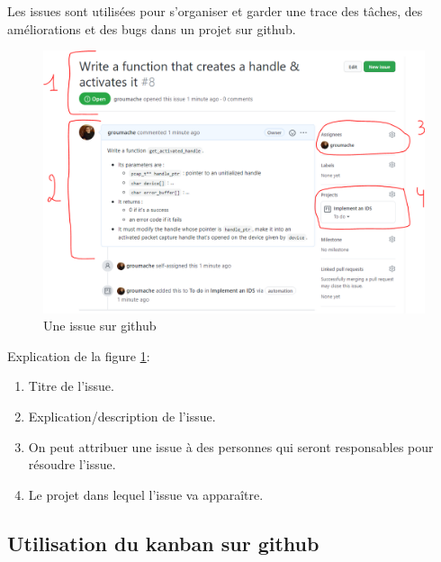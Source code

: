 \documentclass[a4paper]{article}
\begin{document}
Les issues sont utilisées pour s'organiser et garder une trace des tâches, des améliorations et des bugs dans un projet sur github.
\begin{figure}[H]
    \centering
    \includegraphics[width=0.99\linewidth]{../markdown-explanations/images/issue-1.PNG}
    \caption{Une issue sur github}
    \label{fig:issue01}
\end{figure}
Explication de la figure \ref{fig:issue01}:
\begin{enumerate}
    \item Titre de l'issue.
    \item Explication/description de l'issue.
    \item On peut attribuer une issue à des personnes qui seront responsables pour résoudre l'issue.
    \item Le projet dans lequel l'issue va apparaître.
\end{enumerate}





\subsection{Utilisation du kanban sur github}
\end{document}
